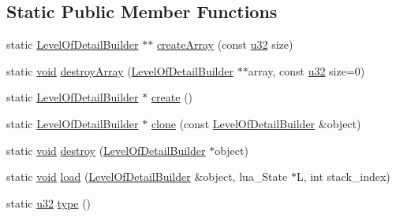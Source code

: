\subsection*{Static Public Member Functions}
\begin{DoxyCompactItemize}
\item 
static \mbox{\hyperlink{classnjli_1_1_level_of_detail_builder}{Level\+Of\+Detail\+Builder}} $\ast$$\ast$ \mbox{\hyperlink{classnjli_1_1_level_of_detail_builder_a9f3853391a2a7d67228ce329bba8ca23}{create\+Array}} (const \mbox{\hyperlink{_util_8h_a10e94b422ef0c20dcdec20d31a1f5049}{u32}} size)
\item 
static \mbox{\hyperlink{_thread_8h_af1e856da2e658414cb2456cb6f7ebc66}{void}} \mbox{\hyperlink{classnjli_1_1_level_of_detail_builder_a06ea6b988384235d876bb57e1b2417ac}{destroy\+Array}} (\mbox{\hyperlink{classnjli_1_1_level_of_detail_builder}{Level\+Of\+Detail\+Builder}} $\ast$$\ast$array, const \mbox{\hyperlink{_util_8h_a10e94b422ef0c20dcdec20d31a1f5049}{u32}} size=0)
\item 
static \mbox{\hyperlink{classnjli_1_1_level_of_detail_builder}{Level\+Of\+Detail\+Builder}} $\ast$ \mbox{\hyperlink{classnjli_1_1_level_of_detail_builder_aa20b31e8de26f34163724d3ce3184849}{create}} ()
\item 
static \mbox{\hyperlink{classnjli_1_1_level_of_detail_builder}{Level\+Of\+Detail\+Builder}} $\ast$ \mbox{\hyperlink{classnjli_1_1_level_of_detail_builder_a63db1f2fc7d0bfd57f4d26ed5bd29247}{clone}} (const \mbox{\hyperlink{classnjli_1_1_level_of_detail_builder}{Level\+Of\+Detail\+Builder}} \&object)
\item 
static \mbox{\hyperlink{_thread_8h_af1e856da2e658414cb2456cb6f7ebc66}{void}} \mbox{\hyperlink{classnjli_1_1_level_of_detail_builder_a7e1cea8fe75376aad4380152b53dcb3c}{destroy}} (\mbox{\hyperlink{classnjli_1_1_level_of_detail_builder}{Level\+Of\+Detail\+Builder}} $\ast$object)
\item 
static \mbox{\hyperlink{_thread_8h_af1e856da2e658414cb2456cb6f7ebc66}{void}} \mbox{\hyperlink{classnjli_1_1_level_of_detail_builder_a59a86dce4eef12f7fd1e12cd161486b3}{load}} (\mbox{\hyperlink{classnjli_1_1_level_of_detail_builder}{Level\+Of\+Detail\+Builder}} \&object, lua\+\_\+\+State $\ast$L, int stack\+\_\+index)
\item 
static \mbox{\hyperlink{_util_8h_a10e94b422ef0c20dcdec20d31a1f5049}{u32}} \mbox{\hyperlink{classnjli_1_1_level_of_detail_builder_a4ce3a6498f6e5208bab1f9ac7b9a8444}{type}} ()
\end{DoxyCompactItemize}
